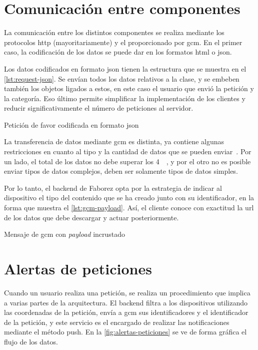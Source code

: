 \documentclass[main]{subfiles}
\begin{document}
\section{Comunicación entre componentes}
\label{sec:arquitectura-comunicacion}

La comunicación entre los distintos componentes se realiza mediante los protocolos \gls{http} (mayoritariamente) y el proporcionado por \gls{gcm}. En el primer caso, la codificación de los datos se puede dar en los formatos \gls{html} o \gls{json}.

Los datos codificados en formato \gls{json} tienen la estructura que se muestra en el \cref{lst:request-json}. Se envían todos los datos relativos a la clase, y se embeben también los objetos ligados a estos, en este caso el usuario que envió la petición y la categoría. Eso último permite simplificar la implementación de los clientes y reducir significativamente el número de peticiones al servidor.

\begin{listing}
  \caption[Petición de favor codificada en formato \acrshort*{json}]{Petición de favor codificada en formato \gls{json}}
  \label{lst:request-json}
\end{listing}

La transferencia de datos mediante \gls{gcm} es distinta, ya contiene algunas restricciones en cuanto al tipo y la cantidad de datos que se pueden enviar~\autocite{gcm-payload}. Por un lado, el total de los datos no debe superar los \SI{4}{\kibi\byte}, y por el otro no es posible enviar tipos de datos complejos, deben ser solamente tipos de datos simples.

Por lo tanto, el \gls{backend} de Faborez opta por la estrategia de indicar al dispositivo el tipo del contenido que se ha creado junto con su identificador, en la forma que muestra el \cref{lst:gcm-payload}. Así, el cliente conoce con exactitud la \gls{url} de los datos que debe descargar y actuar posteriormente.

\begin{listing}
  \caption[Mensaje de \acrshort*{gcm} con \emph{payload} incrustado]{Mensaje de \gls{gcm} con \emph{payload} incrustado}
  \label{lst:gcm-payload}
\end{listing}

\section{Alertas de peticiones}
Cuando un usuario realiza una petición, se realiza un procedimiento que implica a varias partes de la arquitectura. El \gls{backend} filtra a los dispositivos utilizando las coordenadas de la petición, envía a \gls{gcm} sus identificadores y el identificador de la petición, y este servicio es el encargado de realizar las notificaciones mediante el método \gls{push}. En la \cref{fig:alertas-peticiones} se ve de forma gráfica el flujo de los datos.
\end{document}
